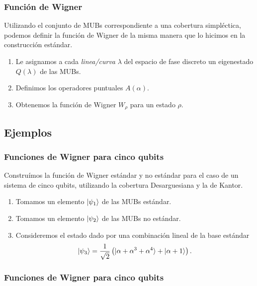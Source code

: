 \documentclass[10pt]{beamer}
\begin{document}
  \begin{frame}
    \frametitle{Función de Wigner}

    Utilizando el conjunto de MUBs correspondiente a una
    cobertura simpléctica, podemos definir la función de
    Wigner de la misma manera que lo hicimos en la
    construcción estándar.

    \begin{enumerate}
      \item Le asignamos a cada \textit{linea/curva}
        $\lambda$ del espacio de fase discreto un
        eigenestado $Q(\lambda)$ de las MUBs.
      \item Definimos los operadores puntuales $A(\alpha)$.
      \item Obtenemos la función de Wigner $W_\rho$ para un
        estado  $\rho$.
    \end{enumerate}
  \end{frame}

  \subsection{Ejemplos}

  \begin{frame}
    \frametitle{Funciones de Wigner para cinco qubits}

    Construímos la función de Wigner estándar y no estándar
    para el caso de un sistema de cinco qubits, utilizando
    la cobertura Desarguesiana y la de Kantor.

    \vspace{5pt}

    \begin{enumerate}
      \item Tomamos un elemento $\ket{\psi_1}$ de las MUBs
        estándar.
      \item Tomamos un elemento $\ket{\psi_2}$ de las MUBs
        no estándar.
      \item Consideremos el estado dado por una combinación
        lineal de la base estándar
        \[
          \ket{\psi_3}
          = \frac{1}{\sqrt{2}} 
          \left( \ket{\alpha + \alpha^3 + \alpha^{4}} +
          \ket{\alpha+1} \right). 
        \]
    \end{enumerate}
  \end{frame}

  \begin{frame}
    \frametitle{Funciones de Wigner para cinco qubits}
  \end{frame}
\end{document}

